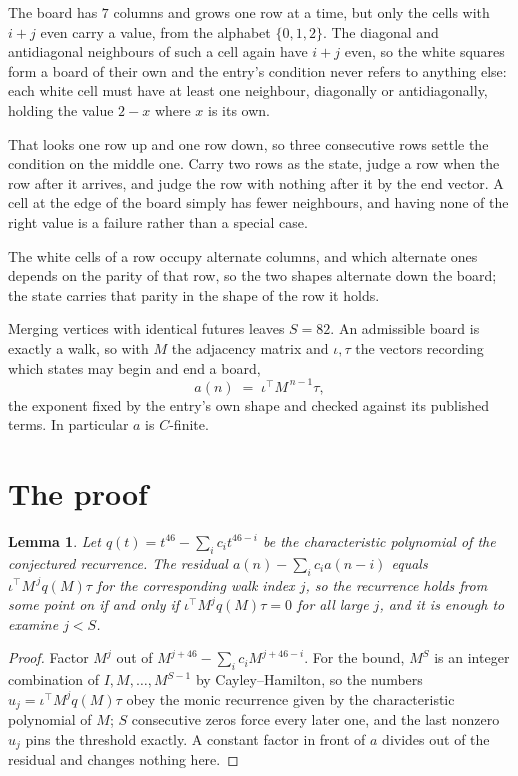\documentclass[11pt,a4paper]{article}
\theoremstyle{plain}
\newtheorem{lemma}[theorem]{Lemma}
\theoremstyle{definition}
\begin{document}
The board has $7$ columns and grows one row at a time, but only the cells with $i+j$ even carry a value, from the alphabet $\{0,1,2\}$. The diagonal and antidiagonal neighbours of such a cell again have $i+j$ even, so the white squares form a board of their own and the entry's condition never refers to anything else: each white cell must have at least one neighbour, diagonally or antidiagonally, holding the value $2-x$ where $x$ is its own.

That looks one row up and one row down, so three consecutive rows settle the condition on the middle one. Carry two rows as the state, judge a row when the row after it arrives, and judge the row with nothing after it by the end vector. A cell at the edge of the board simply has fewer neighbours, and having none of the right value is a failure rather than a special case.

The white cells of a row occupy alternate columns, and which alternate ones depends on the parity of that row, so the two shapes alternate down the board; the state carries that parity in the shape of the row it holds.

Merging vertices with identical futures leaves $S=82$. An admissible board is exactly a walk, so with $M$ the adjacency matrix and $\iota,\tau$ the vectors recording which states may begin and end a board,
\[
a(n)\;=\;\iota^{\!\top}M^{\,n-1}\tau ,
\]
the exponent fixed by the entry's own shape and checked against its published terms. In
particular $a$ is $C$-finite.

\section{The proof}

\begin{lemma}\label{lem:crit}
Let $q(t)=t^{46}-\sum_i c_it^{46-i}$ be the characteristic polynomial of the
conjectured recurrence. The residual $a(n)-\sum_ic_ia(n-i)$ equals
$\iota^{\!\top}M^{\,j}q(M)\tau$ for the corresponding walk index $j$, so the recurrence
holds from some point on if and only if $\iota^{\!\top}M^{j}q(M)\tau=0$ for all large $j$,
and it is enough to examine $j<S$.
\end{lemma}

\begin{proof}
Factor $M^{j}$ out of $M^{j+46}-\sum_ic_iM^{j+46-i}$. For the bound, $M^{S}$
is an integer combination of $I,M,\dots,M^{S-1}$ by Cayley--Hamilton, so the numbers
$u_j=\iota^{\!\top}M^{j}q(M)\tau$ obey the monic recurrence given by the characteristic
polynomial of $M$; $S$ consecutive zeros force every later one, and the last nonzero $u_j$
pins the threshold exactly. A constant factor in front of $a$ divides out of the residual and
changes nothing here.
\end{proof}
\end{document}
